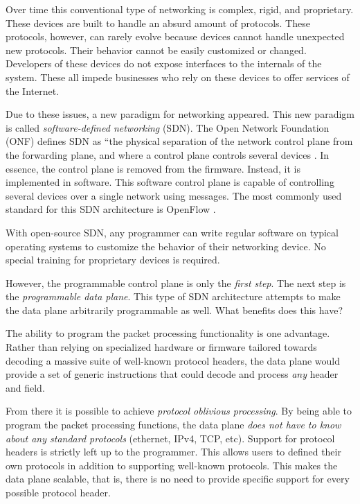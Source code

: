 Over time this conventional type of networking is complex, rigid, and proprietary. These devices are built to handle an absurd amount of protocols. These protocols, however, can rarely evolve because devices cannot handle unexpected new protocols. Their behavior cannot be easily customized or changed. Developers of these devices do not expose interfaces to the internals of the system. These all impede businesses who rely on these devices to offer services of the Internet.

Due to these issues, a new paradigm for networking appeared. This new paradigm is called \textit{software-defined networking} (SDN). The Open Network Foundation (ONF) defines SDN as ``the physical separation of the network control plane from the forwarding plane, and where a control plane controls several devices \cite{onf_sdn_def}. In essence, the control plane is removed from the firmware. Instead, it is implemented in software. This software control plane is capable of controlling several devices over a single network using messages. The most commonly used standard for this SDN architecture is OpenFlow \cite{openflow_spec}.

With open-source SDN, any programmer can write regular software on typical operating systems to customize the behavior of their networking device. No special training for proprietary devices is required.

However, the programmable control plane is only the \emph{first step}. The next step is the \emph{programmable data plane}. This type of SDN architecture attempts to make the data plane arbitrarily programmable as well. What benefits does this have?

The ability to program the packet processing functionality is one advantage. Rather than relying on specialized hardware or firmware tailored towards decoding a massive suite of well-known protocol headers, the data plane would provide a set of generic instructions that could decode and process \emph{any} header and field.

From there it is possible to achieve \textit{protocol oblivious processing}. By being able to program the packet processing functions, the data plane \textit{does not have to know about any standard protocols} (ethernet, IPv4, TCP, etc). Support for protocol headers is strictly left up to the programmer. This allows users to defined their own protocols in addition to supporting well-known protocols. This makes the data plane scalable, that is, there is no need to provide specific support for every possible protocol header.

